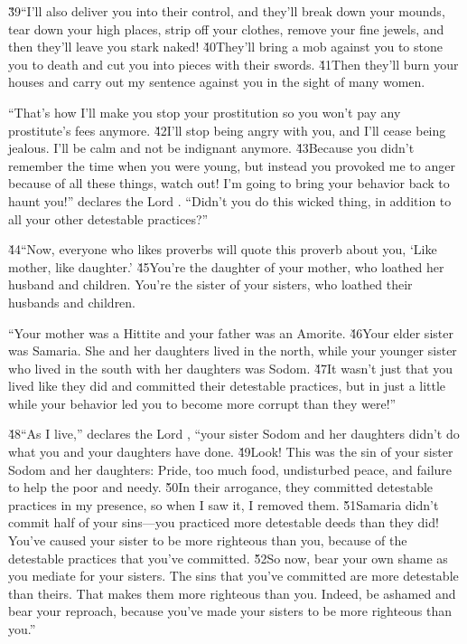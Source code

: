 \v{39}``I'll also deliver you into their control, and they'll break down your mounds, tear down your high places, strip off your clothes, remove your fine jewels, and then they'll leave you stark naked! \v{40}They'll bring a mob against you to stone you to death and cut you into pieces with their swords. \v{41}Then they'll burn your houses and carry out my sentence against you in the sight of many women.

``That's how I'll make you stop your prostitution so you won't pay any prostitute's fees anymore. \v{42}I'll stop being angry with you, and I'll cease being jealous. I'll be calm and not be indignant anymore. \v{43}Because you didn't remember the time when you were young, but instead you provoked me to anger because of all these things, watch out! I'm going to bring your behavior back to haunt you!'' declares the Lord . ``Didn't you do this wicked thing, in addition to all your other detestable practices?''

\v{44}``Now, everyone who likes proverbs will quote this proverb about you, `Like mother, like daughter.' \v{45}You're the daughter of your mother, who loathed her husband and children. You're the sister of your sisters, who loathed their husbands and children.

``Your mother was a Hittite and your father was an Amorite. \v{46}Your elder sister was Samaria. She and her daughters lived in the north, while your younger sister who lived in the south with her daughters was Sodom. \v{47}It wasn't just that you lived like they did and committed their detestable practices, but in just a little while your behavior led you to become more corrupt than they were!''

\v{48}``As I live,'' declares the Lord , ``your sister Sodom and her daughters didn't do what you and your daughters have done. \v{49}Look! This was the sin of your sister Sodom and her daughters: Pride, too much food, undisturbed peace, and failure to help the poor and needy. \v{50}In their arrogance, they committed detestable practices in my presence, so when I saw it, I removed them. \v{51}Samaria didn't commit half of your sins---you practiced more detestable deeds than they did! You've caused your sister to be more righteous than you, because of the detestable practices that you've committed. \v{52}So now, bear your own shame as you mediate for your sisters. The sins that you've committed are more detestable than theirs. That makes them more righteous than you. Indeed, be ashamed and bear your reproach, because you've made your sisters to be more righteous than you.''

